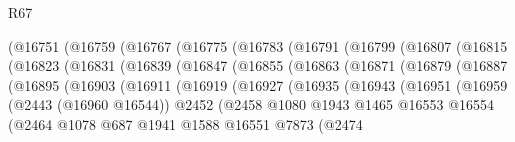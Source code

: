 \begin{lexlean}{R67}
\begin{coremodule}
                (@16751
                  (@16759
                    (@16767
                      (@16775
                        (@16783
                          (@16791
                            (@16799
                              (@16807
                                (@16815
                                  (@16823
                                    (@16831
                                      (@16839
                                        (@16847
                                          (@16855
                                            (@16863
                                              (@16871
                                                (@16879
                                                  (@16887
                                                    (@16895
                                                      (@16903
                                                        (@16911
                                                          (@16919
                                                            (@16927
                                                              (@16935
                                                                (@16943
                                                                  (@16951
                                                                    (@16959
                                                                      (@2443 (@16960 @16544))
                                                                      @2452
                                                                      (@2458
                                                                        @1080
                                                                        @1943
                                                                        @1465
                                                                        @16553
                                                                        @16554
                                                                        (@2464
                                                                          @1078
                                                                          @687
                                                                          @1941
                                                                          @1588
                                                                          @16551
                                                                          @7873
                                                                          (@2474

\end{coremodule}
\end{lexlean}
